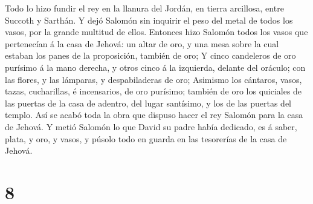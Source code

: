 Todo lo hizo fundir el rey en la llanura del Jordán, en tierra
arcillosa, entre Succoth y Sarthán.  Y dejó Salomón sin
inquirir el peso del metal de todos los vasos, por la grande multitud de
ellos.  Entonces hizo Salomón todos los vasos que
pertenecían á la casa de Jehová: un altar de oro, y una mesa sobre la
cual estaban los panes de la proposición, también de oro;
 Y cinco candeleros de oro purísimo á la mano derecha, y
otros cinco á la izquierda, delante del oráculo; con las flores, y las
lámparas, y despabiladeras de oro;  Asimismo los
cántaros, vasos, tazas, cucharillas, é incensarios, de oro purísimo;
también de oro los quiciales de las puertas de la casa de adentro, del
lugar santísimo, y los de las puertas del templo.  Así se
acabó toda la obra que dispuso hacer el rey Salomón para la casa de
Jehová. Y metió Salomón lo que David su padre había dedicado, es á
saber, plata, y oro, y vasos, y púsolo todo en guarda en las tesorerías
de la casa de Jehová.

\hypertarget{section-7}{%
\section{8}\label{section-7}}

